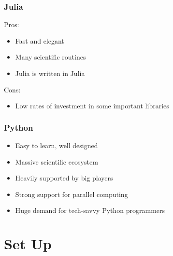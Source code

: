 \documentclass[
    xcolor={svgnames,dvipsnames},
    hyperref={colorlinks, citecolor=DeepPink4, linkcolor=DarkRed, urlcolor=DarkBlue}
    ]{beamer}  %
\newcommand{\1}{\mathbbm 1}
\begin{document}
\begin{frame}
    \frametitle{Julia}

    Pros:
    
    \begin{itemize}
        \item Fast and elegant
            \vspace{0.5em}
        \item Many scientific routines
            \vspace{0.5em}
        \item Julia is written in Julia
    \end{itemize}

            \vspace{0.5em}
            \vspace{0.5em}
            \vspace{0.5em}
    Cons:
    
    \begin{itemize}
        \item Low rates of investment in some important libraries
    \end{itemize}

\end{frame}




\begin{frame}
    \frametitle{Python}
    
    \begin{itemize}
        \item Easy to learn, well designed
            \vspace{0.5em}
        \item Massive scientific ecosystem
            \vspace{0.5em}
        \item Heavily supported by big players
            \vspace{0.5em}
        \item Strong support for parallel computing
            \vspace{0.5em}
        \item Huge demand for tech-savvy Python programmers
    \end{itemize}


\end{frame}




\section{Set Up}
\end{document}
